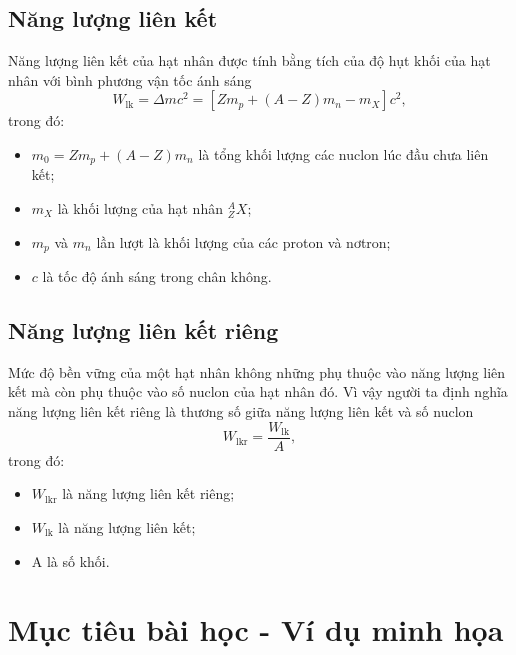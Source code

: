 \subsection{Năng lượng liên kết}
	Năng lượng liên kết của hạt nhân được tính bằng tích của độ hụt khối của hạt nhân với bình phương vận tốc ánh sáng
	\begin{equation}
	W_\text{lk}=\Delta m c^2 = \left[ Z m_p+ (A-Z) m_n - m_X \right] c^2,
	\end{equation}
	trong đó:
		\begin{itemize}
		\item $m_0=Z m_p+ (A-Z) m_n$ là tổng khối lượng các nuclon lúc đầu chưa liên kết;
		\item $m_X$ là khối lượng của hạt nhân $^A_Z X$;
		\item $m_p$ và $m_n$ lần lượt là khối lượng của các proton và nơtron;
		\item $c$ là tốc độ ánh sáng trong chân không.
	\end{itemize}
\subsection{Năng lượng liên kết riêng}
	Mức độ bền vững của một hạt nhân không những phụ thuộc vào năng lượng liên kết mà còn phụ thuộc vào số nuclon của hạt nhân đó. Vì vậy người ta định nghĩa năng lượng liên kết riêng là thương số giữa năng lượng liên kết và số nuclon
	\begin{equation}
	W_\text{lkr}=\dfrac{W_\text{lk}}{A},
	\end{equation}
	trong đó:
	\begin{itemize}
		\item $W_\text{lkr}$ là năng lượng liên kết riêng;
		\item $W_\text{lk}$ là năng lượng liên kết;
		\item A là số khối.
	\end{itemize}
	
\section{Mục tiêu bài học - Ví dụ minh họa}

